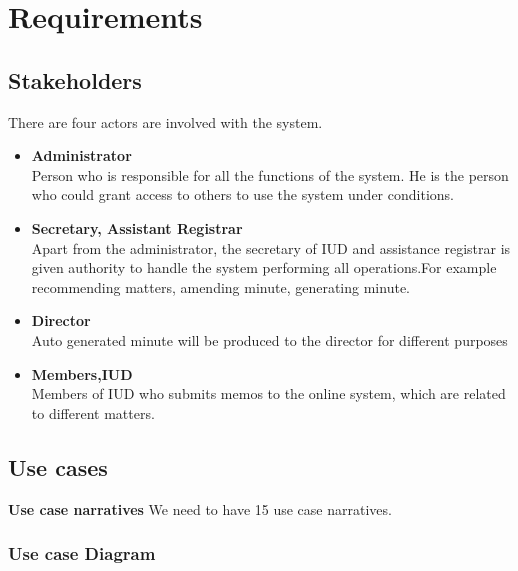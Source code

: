 \documentclass[a4paper,beamer]{article}
\begin{document}
	\section{Requirements}
	
	\subsection{Stakeholders}
	There are four actors are involved with the system.\newline
	
	\begin{itemize}
	\item\textbf{Administrator} \\
		Person who is responsible for all the functions of the system. He is the person who could grant access to others to use the system under conditions.
	\item\textbf{Secretary, Assistant Registrar} \\
		Apart from the administrator, the secretary of IUD and assistance registrar is given authority to handle the system performing all operations.For example recommending matters, amending minute, generating minute.
	\item\textbf{Director}\\
		Auto generated minute will be produced to the director for different purposes 
	\item\textbf{Members,IUD}\\
		Members of IUD who submits memos to the online system, which are related to different matters.
	\end{itemize}
	
	\subsection{Use cases}
	
	\textbf{Use case narratives}
	We need to have 15 use case narratives.
	\newpage      
	
	\subsubsection{Use case Diagram}
	
\end{document}
